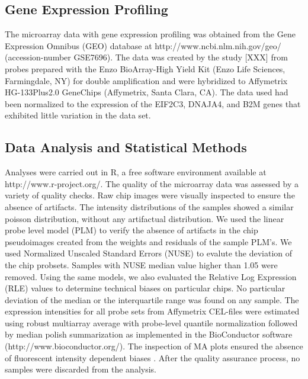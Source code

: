\documentclass[9pt,twocolumn,twoside]{gsajnl}
\begin{document}
\subsection*{Gene Expression Profiling}

The microarray data with gene expression profiling was obtained from the Gene Expression Omnibus (GEO) database at http://www.ncbi.nlm.nih.gov/geo/ (accession-number GSE7696). The data was created by the study [XXX] from probes prepared with the Enzo BioArray-High Yield Kit (Enzo Life Sciences, Farmingdale, NY) for double amplification and were hybridized to Affymetrix HG-133Plus2.0 GeneChips (Affymetrix, Santa Clara, CA). The data used had been normalized to the expression of the EIF2C3, DNAJA4, and B2M genes that exhibited little variation in the data set.

\subsection*{Data Analysis and Statistical Methods}

Analyses were carried out in R, a free software environment available at http://www.r-project.org/. The quality of the microarray data was assessed by a variety of quality checks. Raw chip images were visually inspected to ensure the absence of  artifacts. The intensity distributions of the samples showed a similar poisson distribution, without any artifactual distribution. We used the linear probe level model (PLM) \citep{Bolstad2004, Brettschneider2007} to verify the absence of artifacts in the chip pseudoimages created from the weights and residuals of the sample PLM's. We used Normalized Unscaled Standard Errors (NUSE) \citep{Bolstad2004} to evalute the deviation of the chip probsets. Samples with NUSE median value higher than 1.05 were removed. Using the same models, we also evaluated the Relative Log Expression (RLE) values \citep{Bolstad2004, Brettschneider2007} to determine technical biases on particular chips. No particular deviation of the median or the interquartile range was found on any sample. The expression intensities for all probe sets from Affymetrix CEL-files were estimated using robust multiarray average  with probe-level quantile normalization followed by median polish summarization \citep{Irizarry2003} as implemented in the BioConductor software (http://www.bioconductor.org/). The inspection of MA plots ensured the absence of fluorescent intensity dependent biases \citep{Bolstad2004}. After the quality assurance process, no samples were discarded from the analysis.
\end{document}

